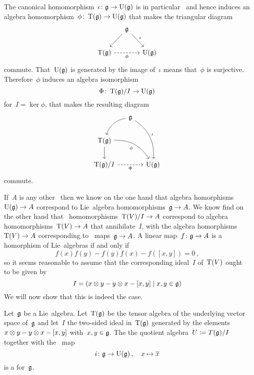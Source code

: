 \begin{remark}
  The canonical homomorphism~$\iota \colon \mathfrak{g} \to \operatorname{U}(\mathfrak{g})$ is in particular~{\linear{$\kf$}} and hence induces an algebra homomorphism~$\phi \colon \operatorname{T}(\mathfrak{g}) \to \operatorname{U}(\mathfrak{g})$ that makes the triangular diagram
  \[
    \begin{tikzcd}[column sep = small]
      {}
      &
      \glie
      \arrow{dl}
      \arrow{dr}[above right]{\iota}
      &
      {}
      \\
      \Tensor(\glie)
      \arrow[dashed]{rr}[below]{\phi}
      &
      {}
      &
      \Univ(\glie)
    \end{tikzcd}
  \]
  commute.
  That~$\operatorname{U}(\mathfrak{g})$ is generated by the image of~$\iota$ means that~$\phi$ is surjective.
  Therefore~$\phi$ induces an algebra isomorphism
  \[
    \Phi
    \colon
    \operatorname{T}(\mathfrak{g})/I
    \to
    \operatorname{U}(\mathfrak{g})
  \]
  for~$I = \ker \phi$, that makes the resulting diagram
   \[
    \begin{tikzcd}[column sep = small]
      {}
      &
      \glie
      \arrow[bend right]{dl}
      \arrow[bend left]{ddr}[above right]{\iota}
      &
      {}
      \\
      \Tensor(\glie)
      \arrow[bend left]{drr}[below left]{\phi}
      \arrow{d}
      &
      {}
      &
      {}
      \\
      \Tensor(\glie)/I
      \arrow[dashed]{rr}[below]{\Phi}
      &
      {}
      &
      \Univ(\glie)
    \end{tikzcd}
  \]
  commute.
  
  If~$A$ is any other~{\algebra{$\kf$}} then we know on the one hand that algebra homorphisms~$\operatorname{U}(\mathfrak{g}) \to A$ correspond to Lie~algebra homomorphisms~$\mathfrak{g} \to A$.
  We know find on the other hand that~{\algebra{$\kf$}} homomorphisms~$\operatorname{T}(V)/I \to A$ correspond to algebra homomorphisms~$\operatorname{T}(V) \to A$ that annihilate~$I$, with the algebra homorphisms~$\operatorname{T}(V) \to A$ corresponding to~{\linear{$\kf$}} maps~$\mathfrak{g} \to A$.
  A linear map~$f \colon \mathfrak{g} \to A$ is a homorphism of Lie~algebras if and only if
  \[
      f(x)f(y)
    - f(y)f(x)
    - f([x,y])
    =
    0 \,,
  \]
  so it seems reasonable to assume that the corresponding ideal~$I$ of~$\operatorname{T}(V)$ ought to be given by
  \[
    I
    =
    (x \tensor y - y \tensor x - [x,y] \suchthat x, y \in \glie)
  \]
  We will now show that this is indeed the case.
\end{remark}


\begin{proposition}
  Let~$\mathfrak{g}$ be a Lie~algebra.
  Let~$\operatorname{T}(\mathfrak{g})$ be the tensor algebra of the underlying vector space of~$\mathfrak{g}$ and let~$I$ the two-sided ideal in~$\operatorname{T}(\mathfrak{g})$ generated by the elements $x \otimes y - y \otimes x - [x,y]$ with~$x,y \in \mathfrak{g}$.
  The the quotient algebra~$U \coloneqq T(\mathfrak{g})/I$ together with the~{\linear{$\kf$}} map
  \[
    i
    \colon
    \mathfrak{g}
    \to
    \operatorname{U}(\mathfrak{g}) \,,
    \quad
    x
    \mapsto
    \overline{x}
  \]
  is a {\ua} for~$\mathfrak{g}$.
\end{proposition}


